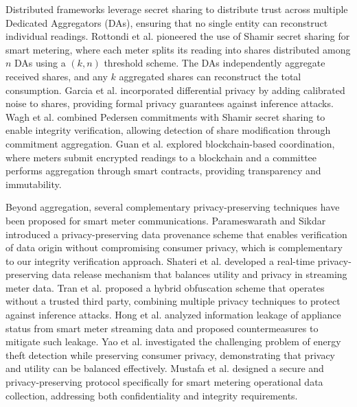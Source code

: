 \documentclass[conference]{IEEEtran}
\begin{document}
Distributed frameworks leverage secret sharing to distribute trust across multiple Dedicated Aggregators (DAs), ensuring that no single entity can reconstruct individual readings. Rottondi et al. \cite{rottondi2013distributed} pioneered the use of Shamir secret sharing for smart metering, where each meter splits its reading into shares distributed among \(n\) DAs using a \((k,n)\) threshold scheme. The DAs independently aggregate received shares, and any \(k\) aggregated shares can reconstruct the total consumption. Garcia et al. incorporated differential privacy by adding calibrated noise to shares, providing formal privacy guarantees against inference attacks. Wagh et al. combined Pedersen commitments \cite{pedersen1991non} with Shamir secret sharing \cite{shamir1979how} to enable integrity verification, allowing detection of share modification through commitment aggregation. Guan et al. explored blockchain-based coordination, where meters submit encrypted readings to a blockchain and a committee performs aggregation through smart contracts, providing transparency and immutability.

Beyond aggregation, several complementary privacy-preserving techniques have been proposed for smart meter communications. Parameswarath and Sikdar \cite{parameswarath2024provenance} introduced a privacy-preserving data provenance scheme that enables verification of data origin without compromising consumer privacy, which is complementary to our integrity verification approach. Shateri et al. \cite{shateri2024realtime} developed a real-time privacy-preserving data release mechanism that balances utility and privacy in streaming meter data. Tran et al. \cite{tran2024hybrid} proposed a hybrid obfuscation scheme that operates without a trusted third party, combining multiple privacy techniques to protect against inference attacks. Hong et al. \cite{hong2018privacy} analyzed information leakage of appliance status from smart meter streaming data and proposed countermeasures to mitigate such leakage. Yao et al. \cite{yao2024theft} investigated the challenging problem of energy theft detection while preserving consumer privacy, demonstrating that privacy and utility can be balanced effectively. Mustafa et al. \cite{mustafa2023secure} designed a secure and privacy-preserving protocol specifically for smart metering operational data collection, addressing both confidentiality and integrity requirements.
\end{document}
